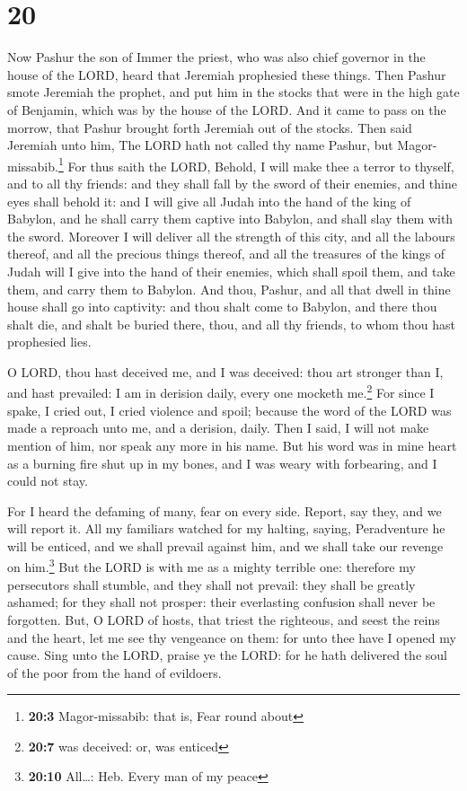 \hypertarget{section-19}{%
\section{20}\label{section-19}}

 Now Pashur the son of Immer the priest, who was also
chief governor in the house of the LORD, heard that Jeremiah prophesied
these things.  Then Pashur smote Jeremiah the prophet, and
put him in the stocks that were in the high gate of Benjamin, which was
by the house of the LORD.  And it came to pass on the
morrow, that Pashur brought forth Jeremiah out of the stocks. Then said
Jeremiah unto him, The LORD hath not called thy name Pashur, but
Magor-missabib.\footnote{\textbf{20:3} Magor-missabib: that is, Fear
  round about}  For thus saith the LORD, Behold, I will
make thee a terror to thyself, and to all thy friends: and they shall
fall by the sword of their enemies, and thine eyes shall behold it: and
I will give all Judah into the hand of the king of Babylon, and he shall
carry them captive into Babylon, and shall slay them with the sword.
 Moreover I will deliver all the strength of this city,
and all the labours thereof, and all the precious things thereof, and
all the treasures of the kings of Judah will I give into the hand of
their enemies, which shall spoil them, and take them, and carry them to
Babylon.  And thou, Pashur, and all that dwell in thine
house shall go into captivity: and thou shalt come to Babylon, and there
thou shalt die, and shalt be buried there, thou, and all thy friends, to
whom thou hast prophesied lies.

 O LORD, thou hast deceived me, and I was deceived: thou
art stronger than I, and hast prevailed: I am in derision daily, every
one mocketh me.\footnote{\textbf{20:7} was deceived: or, was enticed}
 For since I spake, I cried out, I cried violence and
spoil; because the word of the LORD was made a reproach unto me, and a
derision, daily.  Then I said, I will not make mention of
him, nor speak any more in his name. But his word was in mine heart as a
burning fire shut up in my bones, and I was weary with forbearing, and I
could not stay.

 For I heard the defaming of many, fear on every side.
Report, say they, and we will report it. All my familiars watched for my
halting, saying, Peradventure he will be enticed, and we shall prevail
against him, and we shall take our revenge on him.\footnote{\textbf{20:10}
  All\ldots: Heb. Every man of my peace}  But the LORD is
with me as a mighty terrible one: therefore my persecutors shall
stumble, and they shall not prevail: they shall be greatly ashamed; for
they shall not prosper: their everlasting confusion shall never be
forgotten.  But, O LORD of hosts, that triest the
righteous, and seest the reins and the heart, let me see thy vengeance
on them: for unto thee have I opened my cause.  Sing unto
the LORD, praise ye the LORD: for he hath delivered the soul of the poor
from the hand of evildoers.

